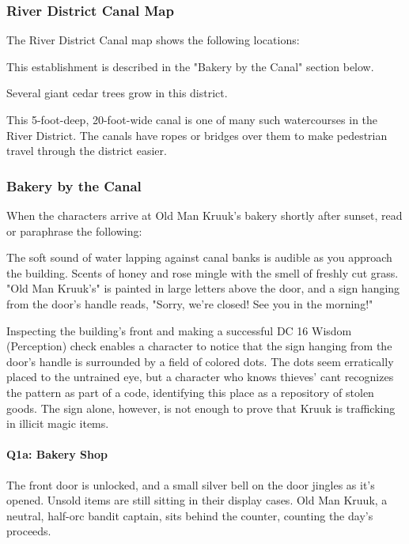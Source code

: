 \documentclass[10pt,a4paper,twoside,bg=print,twocolumn,openany,nodeprecatedcode]{dndbook}
\begin{document}
\subsubsection{River District Canal Map}
The River District Canal map shows the following locations:


\begin{description}[nolistsep]
\item[Q1: Old Man Kruuk's.]
This establishment is described in the "Bakery by the Canal" section below.
\item[Q2: Trees.]
Several giant cedar trees grow in this district.
\item[Q3: Canal.]
This 5-foot-deep, 20-foot-wide canal is one of many such watercourses in the River District. The canals have ropes or bridges over them to make pedestrian travel through the district easier.
\end{description}


\subsubsection{Bakery by the Canal}
When the characters arrive at Old Man Kruuk's bakery shortly after sunset, read or paraphrase the following:

\begin{DndReadAloud}{}
The soft sound of water lapping against canal banks is audible as you approach the building. Scents of honey and rose mingle with the smell of freshly cut grass. "Old Man Kruuk's" is painted in large letters above the door, and a sign hanging from the door's handle reads, "Sorry, we're closed! See you in the morning!"

\end{DndReadAloud}

Inspecting the building's front and making a successful DC 16 Wisdom (Perception) check enables a character to notice that the sign hanging from the door's handle is surrounded by a field of colored dots. The dots seem erratically placed to the untrained eye, but a character who knows thieves' cant recognizes the pattern as part of a code, identifying this place as a repository of stolen goods. The sign alone, however, is not enough to prove that Kruuk is trafficking in illicit magic items.

\paragraph{Q1a: Bakery Shop}
The front door is unlocked, and a small silver bell on the door jingles as it's opened. Unsold items are still sitting in their display cases. Old Man Kruuk, a neutral, half-orc bandit captain, sits behind the counter, counting the day's proceeds.
\end{document}
